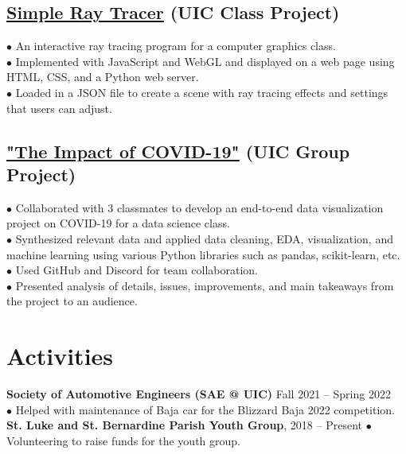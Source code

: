 \documentclass{article}
\begin{document}
\subsection{\href{https://github.com/IanLulu/simple-ray-tracer}{\underline{Simple Ray Tracer}} (UIC Class Project)} %
\vspace{-0.5em}
$\bullet$ An interactive ray tracing program for a computer graphics class.
\\
$\bullet$ Implemented with JavaScript and WebGL and displayed on a web page using HTML, CSS, and a Python web server.
\\
$\bullet$ Loaded in a JSON file to create a scene with ray tracing effects and settings that users can adjust.

\subsection{\href{https://github.com/uic-cs418/cs418-spring22-the-wild-card}{\underline{"The Impact of COVID-19"}} (UIC Group Project)}
\vspace{-0.5em}
$\bullet$ Collaborated with 3 classmates to develop an end-to-end data visualization project on COVID-19 for a data science class.
\\
$\bullet$ Synthesized relevant data and applied data cleaning, EDA, visualization, and machine learning using various Python libraries such as pandas, scikit-learn, etc.
\\
$\bullet$ Used GitHub and Discord for team collaboration.
\\
$\bullet$ Presented analysis of details, issues, improvements, and main takeaways from the project to an audience.


\section{Activities}
\textbf{Society of Automotive Engineers (SAE @ UIC)} \hfill Fall 2021 -- Spring 2022
\\
$\bullet$ Helped with maintenance of Baja car for the Blizzard Baja 2022 competition.
\\
\textbf{St. Luke and St. Bernardine Parish Youth Group}, 2018 -- Present $\bullet$ Volunteering to raise funds for the youth group.
\end{document}
